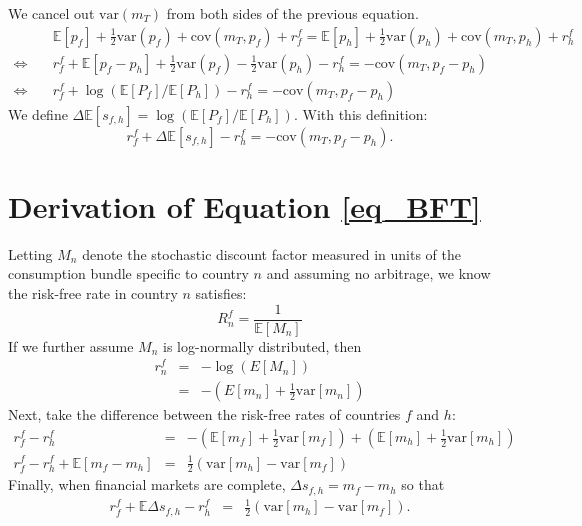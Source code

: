 We cancel out $\text{var}\left( m_T \right)$ from both sides of the previous equation.
\begin{align*}
  & \mathbb{E}\left[p_f\right]+\frac{1}{2}\text{var}\left(p_f\right) + \text{cov}\left(m_T, p_f\right) + r^f_f = \mathbb{E}\left[p_h\right]+\frac{1}{2}\text{var}\left(p_h\right)+\text{cov}\left(m_T,p_h\right) + r^f_h
  \\      \Leftrightarrow \quad
  & r^f_f+\mathbb{E}\left[p_f-p_h\right]+\frac{1}{2}\text{var}\left(p_f\right)-\frac{1}{2}\text{var}\left(p_h\right)-r^f_h = -\text{cov}\left(m_T,p_f-p_h\right)\\   
  \Leftrightarrow\quad
  &r^f_f+\log\left(\mathbb{E}\left[P_f\right]/\mathbb{E}\left[P_h\right]\right)-r^f_h = -\text{cov}\left(m_T,p_f-p_h\right)
\end{align*}
We define
$\Delta\mathbb{E}\left[s_{f,h}\right]
=\log\left(\mathbb{E}\left[P_f\right]/\mathbb{E}\left[P_h\right]\right).$
With this definition:
\begin{equation*} 
  r^f_f+\Delta\mathbb{E}\left[s_{f,h}\right]-r^f_h = -\text{cov}\left(m_T,p_f-p_h\right). 
\end{equation*}

\section{Derivation of Equation \ref{eq_BFT} \label{Appendix_BFT}}

Letting $M_n$ denote the stochastic discount factor measured in units of the consumption bundle specific to country $n$ and assuming no arbitrage, we know the risk-free rate in country $n$ satisfies:
\begin{equation*}
    R^f_n = \frac{1}{\mathbb{E} \left[ M_n\right] }
\end{equation*}
If we further assume $M_n$ is log-normally distributed, then
\begin{eqnarray*}
r^f_n &=&-\log \left( E\left[ M_n \right] \right)  \\
&=&-\left( E\left[ m_n \right] +\frac{1}{2}\text{var}\left[ m_n \right] \right) 
\end{eqnarray*}
Next, take the difference between the risk-free rates of countries $f$ and $h$:
\begin{eqnarray*}
r^f_f - r^f_h  
&=& -\left( \mathbb{E} \left[ m_f \right] +\frac{1}{2}\text{var}\left[ m_f \right] \right) 
+ \left( \mathbb{E}\left[ m_h \right] +\frac{1}{2}\text{var}\left[ m_h \right] \right)  \\
r^f_f-r^f_h + \mathbb{E} \left[ m_f - m_h \right] 
&=& \frac{1}{2}\left( \text{var}\left[ m_h \right] - \text{var}\left[ m_f \right] \right) 
\end{eqnarray*}
Finally, when financial markets are complete, $\Delta s_{f, h} = m_f - m_h$ so that
\begin{eqnarray*}
r^f_f + \mathbb{E} \Delta s_{f, h} - r^f_h 
&=& \frac{1}{2}\left( \text{var}\left[ m_h \right] - \text{var}\left[ m_f \right] \right).
\end{eqnarray*}